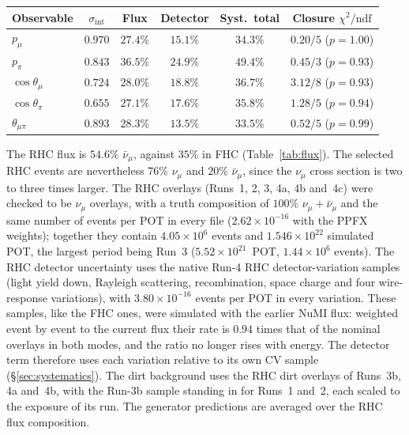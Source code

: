 \documentclass[11pt,a4paper]{article}
\begin{document}
\begin{center}\small
{}
    \label{tab:fhc}
\begin{tabular}{lccccc}
\toprule
Observable & $\sigma_\mathrm{int}$ & Flux & Detector & Syst.\ total & Closure $\chi^2/\mathrm{ndf}$ \\
\midrule
      $p_\mu$            & $0.970$ & $27.4\%$ & $15.1\%$ & $34.3\%$ & $0.20/5$ ($p=1.00$) \\
      $p_\pi$            & $0.843$ & $36.5\%$ & $24.9\%$ & $49.4\%$ & $0.45/3$ ($p=0.93$) \\
      $\cos\theta_\mu$   & $0.724$ & $28.0\%$ & $18.8\%$ & $36.7\%$ & $3.12/8$ ($p=0.93$) \\
      $\cos\theta_\pi$   & $0.655$ & $27.1\%$ & $17.6\%$ & $35.8\%$ & $1.28/5$ ($p=0.94$) \\
      $\theta_{\mu\pi}$  & $0.893$ & $28.3\%$ & $13.5\%$ & $33.5\%$ & $0.52/5$ ($p=0.99$) \\
\bottomrule
\end{tabular}
\end{center}

The RHC flux is $54.6\%$ $\bar\nu_\mu$, against $35\%$ in FHC (Table~\ref{tab:flux}). The selected
RHC events are nevertheless $76\%$ $\nu_\mu$ and $20\%$ $\bar\nu_\mu$, since the $\nu_\mu$ cross
section is two to three times larger. The RHC overlays (Runs~1, 2, 3, 4a, 4b and~4c) were checked to
be $\nu_\mu$ overlays, with a truth composition of $100\%$ $\nu_\mu+\bar\nu_\mu$ and the same number
of events per POT in every file ($2.62\times10^{-16}$ with the PPFX weights); together they contain
$4.05\times10^{6}$ events and $1.546\times10^{22}$ simulated POT, the largest period being Run~3
($5.52\times10^{21}$~POT, $1.44\times10^{6}$ events). The RHC detector uncertainty uses the native
Run-4 RHC detector-variation samples (light yield down, Rayleigh scattering, recombination, space
charge and four wire-response variations), with $3.80\times10^{-16}$ events per POT in every
variation. These samples, like the FHC ones, were simulated with the earlier NuMI flux: weighted event by
event to the current flux their rate is $0.94$ times that of the nominal overlays in both modes, and the
ratio no longer rises with energy. The detector term therefore uses each variation relative to its own CV
sample (\S\ref{sec:systematics}). The dirt background uses the RHC dirt overlays of Runs~3b, 4a and~4b, with the Run-3b
sample standing in for Runs~1 and~2, each scaled to the exposure of its run.
The generator predictions are averaged over the RHC flux composition.
\end{document}
